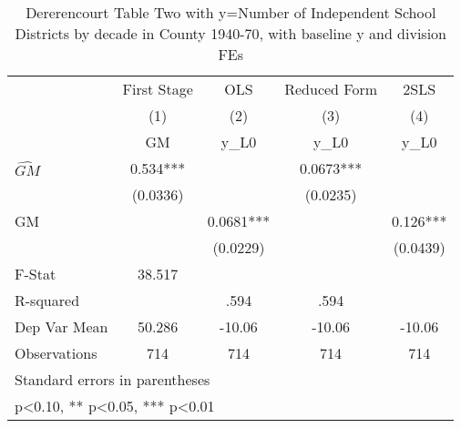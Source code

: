 \begin{table}[htbp]\centering
\def\sym#1{\ifmmode^{#1}\else\(^{#1}\)\fi}
\caption{Dererencourt Table Two with y=Number of Independent School Districts by decade in County 1940-70, with baseline y and division FEs}
\begin{tabular}{l*{4}{c}}
\toprule
                    & First Stage   &         OLS   &Reduced Form   &        2SLS   \\
                    &\multicolumn{1}{c}{(1)}&\multicolumn{1}{c}{(2)}&\multicolumn{1}{c}{(3)}&\multicolumn{1}{c}{(4)}\\
                    &\multicolumn{1}{c}{GM}&\multicolumn{1}{c}{y\_L0}&\multicolumn{1}{c}{y\_L0}&\multicolumn{1}{c}{y\_L0}\\
\midrule
$\hat{GM}$          &       0.534***&               &      0.0673***&               \\
                    &    (0.0336)   &               &    (0.0235)   &               \\
\addlinespace
GM                  &               &      0.0681***&               &       0.126***\\
                    &               &    (0.0229)   &               &    (0.0439)   \\
\midrule
F-Stat              &      38.517   &               &               &               \\
R-squared           &               &        .594   &        .594   &               \\
Dep Var Mean        &      50.286   &      -10.06   &      -10.06   &      -10.06   \\
Observations        &         714   &         714   &         714   &         714   \\
\bottomrule
\multicolumn{5}{l}{\footnotesize Standard errors in parentheses}\\
\multicolumn{5}{l}{\footnotesize * p<0.10, ** p<0.05, *** p<0.01}\\
\end{tabular}
\end{table}
